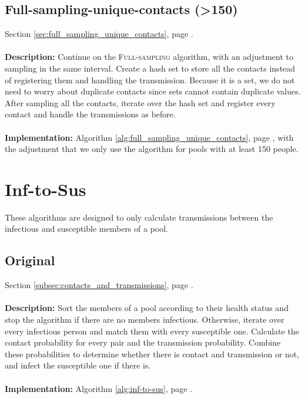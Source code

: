 \begin{appendices}
\subsection{Full-sampling-unique-contacts (>150)}
Section \ref{sec:full_sampling_unique_contacts}, page \pageref{sec:full_sampling_unique_contacts}.
\\\\
\textbf{Description:} Continue on the \textsc{Full-sampling} algorithm, with an adjustment to sampling in the same interval. Create a hash set to store all the contacts instead of registering them and handling the transmission. Because it is a set, we do not need to worry about duplicate contacts since sets cannot contain duplicate values. After sampling all the contacts, iterate over the hash set and register every contact and handle the transmissions as before.
\\\\
\textbf{Implementation:} Algorithm \ref{alg:full_sampling_unique_contacts}, page \pageref{alg:full_sampling_unique_contacts}, with the adjustment that we only use the algorithm for pools with at least 150 people.

\section{Inf-to-Sus}
These algorithms are designed to only calculate transmissions between the infectious and susceptible members of a pool.

\subsection{Original}
Section \ref{subsec:contacts_and_transmissions}, page \pageref{subsec:contacts_and_transmissions}.
\\\\
\textbf{Description:} Sort the members of a pool according to their health status and stop the algorithm if there are no members infectious. Otherwise, iterate over every infectious person and match them with every susceptible one. Calculate the contact probability for every pair and the transmission probability. Combine these probabilities to determine whether there is contact and transmission or not, and infect the susceptible one if there is.
\\\\
\textbf{Implementation:} Algorithm \ref{alg:inf-to-sus}, page \pageref{alg:inf-to-sus}.


\end{appendices}
